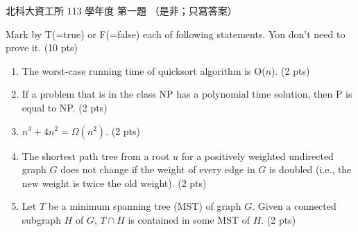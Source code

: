 \begin{pastexam}[label={px:ntut-113-ci-01}]{北科大資工所 113 學年度 第一題}
（是非；只寫答案）

Mark by T(=true) or F(=false) each of following statements. You don't need to prove it. (10 pts)
\begin{enumerate}[label=(\arabic*)]
\item The worst-case running time of quicksort algorithm is O($n$). (2 pts)
\item If a problem that is in the class NP has a polynomial time solution, then P is equal to NP. (2 pts)
\item $n^3 + 4n^2 = \Omega(n^2)$. (2 pts)
\item The shortest path tree from a root $u$ for a positively weighted undirected graph $G$ does not change
if the weight of every edge in $G$ is doubled (i.e., the new weight is twice the old weight). (2 pts)
\item Let $T$ be a minimum spanning tree (MST) of graph $G$. Given a connected subgraph $H$ of $G$,
$T\cap H$ is contained in some MST of $H$. (2 pts)
\end{enumerate}
\end{pastexam}

